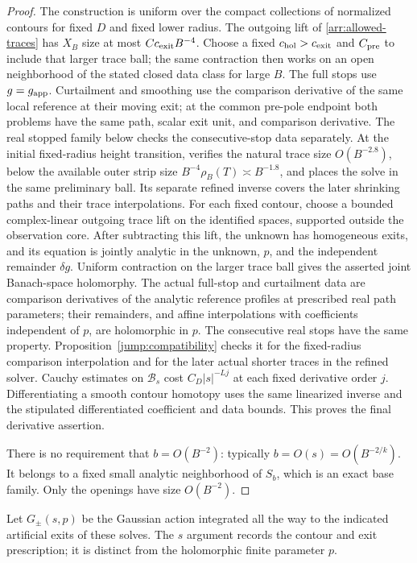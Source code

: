 \begin{proof}
The construction is uniform over the compact collections of normalized
contours for fixed \(D\) and fixed lower radius.  The outgoing lift of
\eqref{arr:allowed-traces} has $X_B$ size at most $Cc_{\rm exit}B^{-4}$.
Choose a fixed $c_{\rm hol}>c_{\rm exit}$ and $C_{\rm pre}$ to include
that larger trace ball; the same
contraction then works on an open neighborhood of the stated closed
data class for large $B$.  The full stops use
$g=g_{\rm app}$.  Curtailment and smoothing use the comparison derivative
of the same local reference at their moving exit; at the common pre-pole
endpoint both problems have the same path, scalar exit unit, and
comparison derivative.  The real stopped family below checks the
consecutive-stop data separately.  At the initial fixed-radius height
transition,  verifies the natural trace size
$O(B^{-2.8})$, below the available outer strip size
$B^{-4}\rho_B(T)\asymp B^{-1.8}$, and places the solve in the same
preliminary ball.  Its separate refined inverse covers the later
shrinking paths and their trace interpolations.
For each fixed contour, choose a bounded complex-linear outgoing trace
lift on the identified spaces, supported outside the observation core.
After subtracting this lift, the unknown has homogeneous exits, and its
equation is jointly analytic in the unknown, \(p\), and the independent
remainder \(\delta g\).  Uniform contraction on the larger trace ball
gives the asserted joint Banach-space holomorphy.  The actual full-stop
and curtailment data are comparison derivatives of the analytic
reference profiles at prescribed real path parameters; their remainders,
and affine interpolations with coefficients independent of \(p\), are
holomorphic in \(p\).  The consecutive real stops have the same
property.  Proposition~\ref{jump:compatibility} checks it for the
fixed-radius comparison interpolation and for the later actual
shorter traces in the refined solver.  Cauchy estimates on
$\mathcal B_s$ cost \(C_D|s|^{-Lj}\) at each fixed derivative order \(j\).
Differentiating a smooth contour homotopy uses the same
linearized inverse and the stipulated differentiated coefficient and
data bounds.
This proves the final derivative assertion.

There is no requirement that \(b=O(B^{-2})\): typically
\(b=O(s)=O(B^{-2/k})\).  It belongs to a fixed small analytic
neighborhood of \(S_b\), which is an exact base family.
Only the openings have size \(O(B^{-2})\).
\end{proof}

Let \(G_\pm(s,p)\) be the Gaussian action integrated all the way
to the indicated artificial exits of these solves.  The \(s\)
argument records the contour and exit prescription; it is
distinct from the holomorphic finite parameter \(p\).

